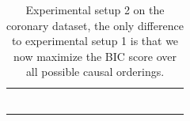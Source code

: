 \documentclass{tufte-book}
\begin{document}
\begin{table}[]
\begin{tabular}{cccccccccccccccc}
                        &                                                                                               &                                 &                              &                             &                              &                             &                              &                             &                                       &                             &                              &  &  &  &  \\
                        &                                                                                               &                                 &                              &                             &                              &                             &                              &                             &                                       &                             &                              &  &  &  &  \\
                        &                                                                                               &                                 &                              &                             &                              &                             &                              &                             &                                       &                             &                              &  &  &  &  \\
                        &                                                                                               &                                 &                              &                             &                              &                             &                              &                             &                                       &                             &                              &  &  &  &  \\
                        &                                                                                               &                                 &                              &                             &                              &                             &                              &                             &                                       &                             &                              &  &  &  &  \\
                        &                                                                                               &                                 &                              &                             &                              &                             &                              &                             &                                       &                             &                              &  &  &  & 
\caption{Experimental setup 2 on the coronary dataset, the only difference to experimental setup 1 is that we now maximize the BIC score over all possible causal orderings.}
			\end{tabular}
\end{table}
\end{document}
